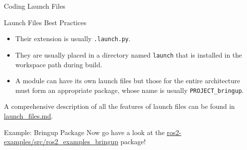 \begin{frame}{Coding Launch Files}
\begin{block}{Launch Files Best Practices}
  \begin{itemize}
    \item Their extension is usually \texttt{.launch.py}.
    \item They are usually placed in a directory named \texttt{launch} that is installed in the workspace path during build.
    \item A module can have its own launch files but those for the entire architecture must form an appropriate package, whose name is usually \texttt{PROJECT\_bringup}.
  \end{itemize}
\end{block}
A comprehensive description of all the features of launch files can be found in \href{https://github.com/IntelligentSystemsLabUTV/ros2-examples/blob/galactic/launch_files.md}{\color{blue}\underline{launch\_files.md}}.
\end{frame}

\begin{frame}{Example: Bringup Package}
  Now go have a look at the \href{https://github.com/IntelligentSystemsLabUTV/ros2-examples/tree/galactic/src/ros2_examples_bringup}{\color{blue}\underline{ros2-examples/src/ros2\_examples\_bringup}} package!
\end{frame}
